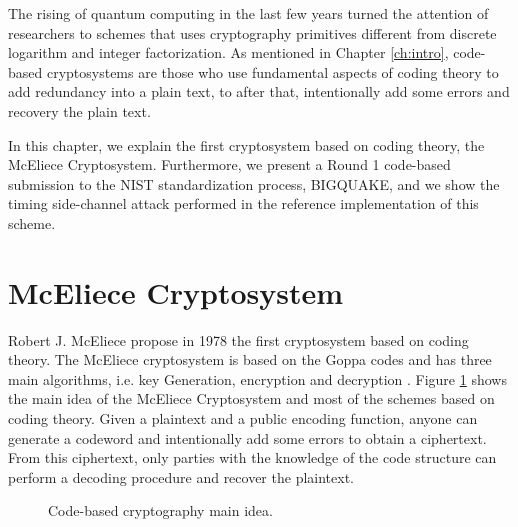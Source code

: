 The rising of quantum computing in the last few years turned the attention of researchers to schemes that uses cryptography primitives different from discrete logarithm and integer factorization. As mentioned in Chapter \ref{ch:intro}, code-based cryptosystems are those who use fundamental aspects of coding theory to add redundancy into a plain text, to after that, intentionally add some errors and recovery the plain text. 

In this chapter, we explain the first cryptosystem based on coding theory, the McEliece Cryptosystem. Furthermore, we present a Round 1 code-based submission to the NIST standardization process, BIGQUAKE, and we show the timing side-channel attack performed in the reference implementation of this scheme.

\section{McEliece Cryptosystem}
Robert J. McEliece propose in 1978 the first cryptosystem based on coding theory. The McEliece cryptosystem is based on the Goppa codes and has three main algorithms, i.e. key Generation, encryption and decryption \cite{mceliece1978public}. Figure \ref{fig:code-idea} shows the main idea of the McEliece Cryptosystem and most of the schemes based on coding theory. Given a plaintext and a public encoding function, anyone can generate a codeword and intentionally add some errors to obtain a ciphertext. From this ciphertext, only parties with the knowledge of the code structure can perform a decoding procedure and recover the plaintext.


\begin{figure}
    \centering
    \caption{Code-based cryptography main idea.}
    \label{fig:code-idea}
\end{figure}

